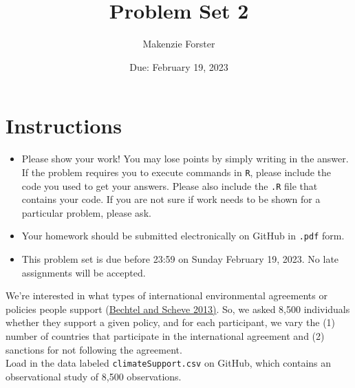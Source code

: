 \documentclass[12pt,letterpaper]{article}
\title{Problem Set 2}
\date{Due: February 19, 2023}
\author{Makenzie Forster}
\begin{document}
	\maketitle
	\section*{Instructions}
	\begin{itemize}
		\item Please show your work! You may lose points by simply writing in the answer. If the problem requires you to execute commands in \texttt{R}, please include the code you used to get your answers. Please also include the \texttt{.R} file that contains your code. If you are not sure if work needs to be shown for a particular problem, please ask.
		\item Your homework should be submitted electronically on GitHub in \texttt{.pdf} form.
		\item This problem set is due before 23:59 on Sunday February 19, 2023. No late assignments will be accepted.
	\end{itemize}

	
	

	\vspace{.25cm}
\noindent We're interested in what types of international environmental agreements or policies people support (\href{https://www.pnas.org/content/110/34/13763}{Bechtel and Scheve 2013)}. So, we asked 8,500 individuals whether they support a given policy, and for each participant, we vary the (1) number of countries that participate in the international agreement and (2) sanctions for not following the agreement. \\

\noindent Load in the data labeled \texttt{climateSupport.csv} on GitHub, which contains an observational study of 8,500 observations.
\end{document}
